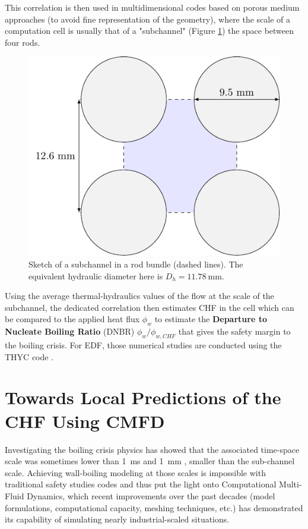 \npar

This correlation is then used in multidimensional codes based on porous medium approaches (to avoid fine representation of the geometry), where the scale of a computation cell is usually that of a "subchannel" (Figure \ref{fig:subchannel_sketch}) \ie the space between four rods.


\begin{figure}[!h]
\centering
\includegraphics[width=0.4\linewidth]{img/intro/subchannel.pdf}
\caption{Sketch of a subchannel in a rod bundle (dashed lines). The equivalent hydraulic diameter here is $D_{h}=11.78\ $mm.}
\label{fig:subchannel_sketch}
\end{figure}

\npar

Using the average thermal-hydraulics values of the flow at the scale of the subchannel, the dedicated correlation then estimates CHF in the cell which can be compared to the applied heat flux $\phi_{w}$ to estimate the \textbf{Departure to Nucleate Boiling Ratio} (DNBR) $\phi_{w} / \phi_{w,CHF}$ that gives the safety margin to the boiling crisis. For EDF, those numerical studies are conducted using the THYC code \cite{aubry_thyc_1995}.

\section{Towards Local Predictions of the CHF Using CMFD}

Investigating the boiling crisis physics has showed that the associated time-space scale was sometimes lower than 1\ ms and 1\ mm \cite{bloch_study_2016}, \ie smaller than the sub-channel scale. Achieving wall-boiling modeling at those scales is impossible with traditional safety studies codes and thus put the light onto Computational Multi-Fluid Dynamics, which recent improvements over the past decades (model formulations, computational capacity, meshing techniques, etc.) has demonstrated its capability of simulating nearly industrial-scaled situations.

\npar


